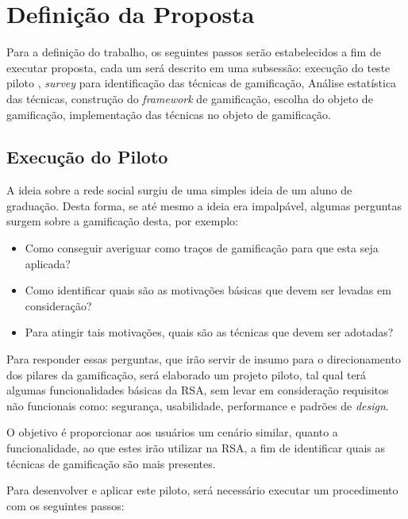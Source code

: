 \chapter[Definição da Proposta]{Definição da Proposta}

Para a definição do trabalho, os seguintes
passos serão estabelecidos a fim de executar proposta, cada um será
descrito em uma subsessão: execução do teste piloto , \textit{survey} para identificação das técnicas de gamificação,
Análise estatística das técnicas, construção do \textit{framework} de gamificação, escolha do objeto de gamificação,
implementação das técnicas no objeto de gamificação.

\section{Execução do Piloto}
\label{sub:execu_o_do_piloto}
A ideia sobre a rede social surgiu de uma simples ideia de um aluno de graduação. Desta forma, se até mesmo a
ideia era impalpável, algumas perguntas surgem sobre a gamificação desta, por exemplo:

\begin{itemize}
    \item Como conseguir averiguar como traços de gamificação para que esta seja aplicada?
    \item Como identificar quais são as motivações básicas que devem ser levadas em consideração?
    \item Para atingir tais motivações, quais são as técnicas que devem ser adotadas?
\end{itemize}

Para responder essas perguntas, que irão servir de insumo para o direcionamento dos pilares da gamificação, será elaborado um projeto piloto, tal qual terá algumas funcionalidades básicas da RSA, sem levar em consideração requisitos não funcionais como: segurança, usabilidade, performance e padrões de \textit{design}.

O objetivo é proporcionar aos usuários um cenário similar, quanto a funcionalidade, ao que estes irão utilizar
na RSA, a fim de identificar quais as técnicas de gamificação são mais presentes.

Para desenvolver e aplicar este piloto, será necessário executar um procedimento com os seguintes passos:

